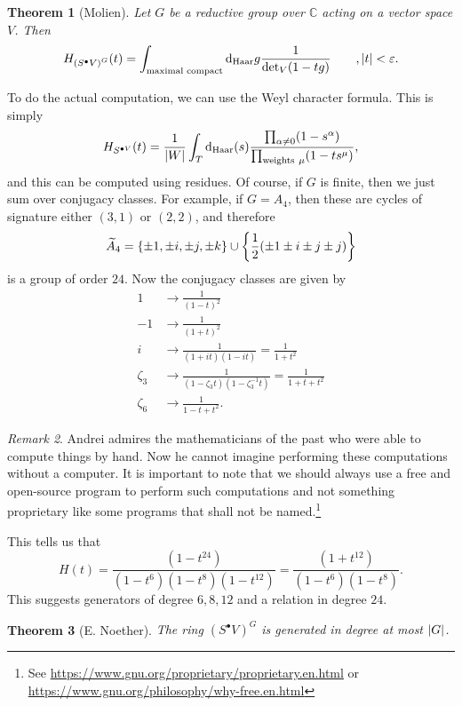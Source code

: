 \documentclass[leqno, openany]{memoir}
\newtheorem{thm}{Theorem}[section]
\theoremstyle{definition}
\theoremstyle{remark}
\newtheorem{rmk}[thm]{Remark}
\theoremstyle{plain}
\theoremstyle{definition}
\theoremstyle{remark}
\newcommand{\C}{\mathbb{C}}
\newcommand{\ep}{\varepsilon}
\newcommand{\mr}[1]{\mathrm{#1}}
\newcommand{\wtl}[1]{\widetilde{#1}}
\begin{document}
\begin{thm}[Molien]
    Let $G$ be a reductive group over $\C$ acting on a vector space $V$. Then
    \[ H_{{(S^{\bullet} V)}^G}(t) = \int_{\text{maximal compact}} \dd_{\mr{Haar}}g \frac{1}{\det_V(1-tg)} \qquad, \abs{t} < \ep. \]
\end{thm}

To do the actual computation, we can use the Weyl character formula. This is simply
\[ H_{S^{\bullet V}}(t) = \frac{1}{\abs{W}} \int_T \dd_{\mr{Haar}}(s) \frac{\prod_{\alpha \neq 0} (1-s^{\alpha})}{\prod_{\text{weights}\ \mu} (1 - ts^{\mu})}, \]
and this can be computed using residues. Of course, if $G$ is finite, then we just sum over conjugacy classes. For example, if $G = A_4$, then these are cycles of signature either $(3,1)$ or $(2,2)$, and therefore
\[ \wtl{A}_4 = \qty{\pm 1, \pm i, \pm j, \pm k} \cup \qty{\frac{1}{2}(\pm 1 \pm i \pm j \pm j)} \]
is a group of order $24$. Now the conjugacy classes are given by
\begin{align*}
    1 &\longrightarrow \frac{1}{{(1-t)}^2} \\
    -1 &\longrightarrow \frac{1}{{(1+t)}^2} \\
    i &\longrightarrow \frac{1}{(1+it)(1-it)} = \frac{1}{1+t^2} \\
    \zeta_3 &\longrightarrow \frac{1}{(1-\zeta_3 t)(1-\zeta_3^{-1}t)} = \frac{1}{1+t+t^2} \\
    \zeta_6 &\longrightarrow \frac{1}{1-t+t^2}.
\end{align*}

\begin{rmk}
    Andrei admires the mathematicians of the past who were able to compute things by hand. Now he cannot imagine performing these computations without a computer. It is important to note that we should always use a free and open-source program to perform such computations and not something proprietary like some programs that shall not be named.\footnote{See \url{https://www.gnu.org/proprietary/proprietary.en.html} or \url{https://www.gnu.org/philosophy/why-free.en.html}}
\end{rmk}

This tells us that 
\[ H(t) = \frac{(1-t^{24})}{(1-t^6)(1-t^8)(1-t^{12})} = \frac{(1+t^{12})}{(1-t^6)(1-t^8)}. \]
This suggests generators of degree $6,8,12$ and a relation in degree $24$.

\begin{thm}[E. Noether]
    The ring ${(S^{\bullet}V)}^G$ is generated in degree at most $\abs{G}$.
\end{thm}
\end{document}
